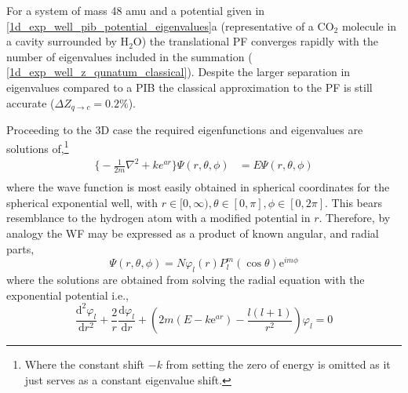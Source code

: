 \documentclass[../main.tex]{subfiles}
\begin{document}
For a system of mass 48 amu and a potential given in \figurename{ \ref{1d_exp_well_pib_potential_eigenvalues}a} (representative of a CO$_2$ molecule in a cavity surrounded by H$_2$O) the translational PF converges rapidly with the number of eigenvalues included in the summation (\figurename{ \ref{1d_exp_well_z_qunatum_classical}}). Despite the larger separation in eigenvalues compared to a PIB the classical approximation to the PF is still accurate ($\Delta Z_{q\rightarrow c} = 0.2\%$).

Proceeding to the 3D case the required eigenfunctions and eigenvalues are solutions of,\footnote{Where the constant shift $-k$ from setting the zero of energy is omitted as it just serves as a constant eigenvalue shift.}
\begin{equation}
\begin{aligned}
{\Big \{} -\frac{1}{2m} \nabla^2 + k e^{ar} {\Big \}}\Psi(r, \theta, \phi) &= E\Psi(r, \theta, \phi) \\ 
\end{aligned}
\label{3d_exp_well_SE}
\end{equation}
where the wave function is most easily obtained in spherical coordinates for the spherical exponential well, with $r \in [0, \infty), \theta \in [0, \pi], \phi \in [0, 2\pi]$. This bears resemblance to the hydrogen atom with a modified potential in $r$. Therefore, by analogy the WF may be expressed as a product of known angular, and radial parts,
\begin{equation}
\Psi(r, \theta, \phi) = N \varphi_{l}(r) P_l^m(\cos\theta) \text{e}^{im\phi} 
\end{equation}
where the solutions are obtained from solving the radial equation with the exponential potential i.e.,
\begin{equation}
\frac{\text{d}^2\varphi_l}{\text{d} r^2} + \frac{2}{r} \frac{\text{d}\varphi_l}{\text{d}r} + \left(2m\left(E - k\text{e}^{ar}\right) - \frac{l(l+1)}{r^2}\right)\varphi_l = 0
\label{3d_exp_well_radial}
\end{equation}
\end{document}
